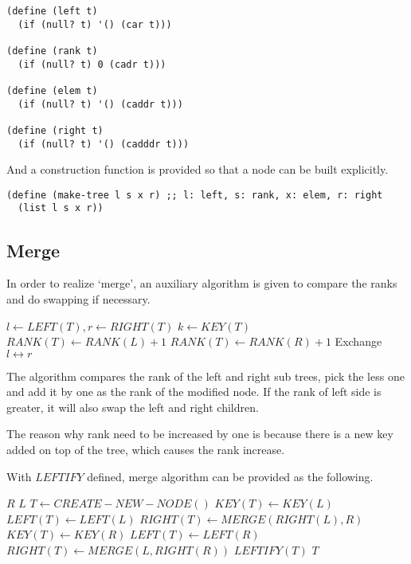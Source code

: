 \documentclass{article}
\begin{document}
\lstset{language=lisp}
\begin{lstlisting}
(define (left t)
  (if (null? t) '() (car t)))

(define (rank t)
  (if (null? t) 0 (cadr t)))

(define (elem t)
  (if (null? t) '() (caddr t)))

(define (right t)
  (if (null? t) '() (cadddr t)))
\end{lstlisting}

And a construction function is provided so that a node can be
built explicitly.

\begin{lstlisting}
(define (make-tree l s x r) ;; l: left, s: rank, x: elem, r: right
  (list l s x r))
\end{lstlisting}

\subsection{Merge}

In order to realize `merge', an auxiliary algorithm is given to
compare the ranks and do swapping if necessary.

\begin{algorithmic}[1]
  \State $l \gets LEFT(T), r \gets RIGHT(T)$
  \State $k \gets KEY(T)$
    \State $RANK(T) \gets RANK(L) + 1$
  \Else
    \State $RANK(T) \gets RANK(R) + 1$
    \State Exchange $l \leftrightarrow r$
  \EndIf
\EndFunction
\end{algorithmic}

The algorithm compares the rank of the left and
right sub trees, pick the less one and add it by one as the
rank of the modified node. If the rank of left side is greater,
it will also swap the left and right children.

The reason why rank need to be increased by one is because there
is a new key added on top of the tree, which causes the rank
increase.

With $LEFTIFY$ defined, merge algorithm can be provided as the
following.

\begin{algorithmic}[1]
    \State \Return $R$
    \State \Return $L$
  \Else
    \State $T \gets CREATE-NEW-NODE()$
      \State $KEY(T) \gets KEY(L)$
      \State $LEFT(T) \gets LEFT(L)$
      \State $RIGHT(T) \gets MERGE(RIGHT(L), R)$
    \Else
      \State $KEY(T) \gets KEY(R)$
      \State $LEFT(T) \gets LEFT(R)$
      \State $RIGHT(T) \gets MERGE(L, RIGHT(R))$
    \EndIf
    \State $LEFTIFY(T)$
  \EndIf
  \State \Return $T$
\EndFunction
\end{algorithmic}
\end{document}
